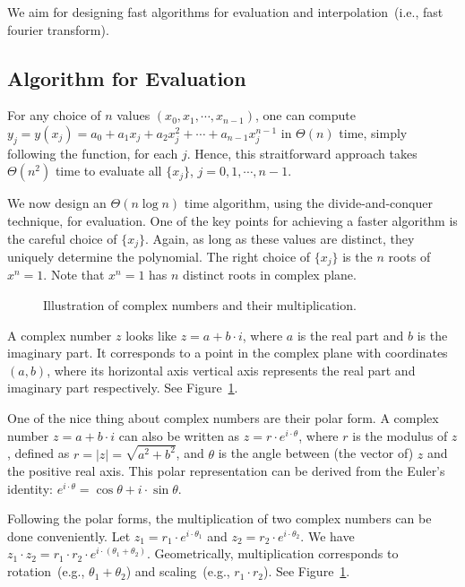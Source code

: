 We aim for designing fast algorithms for evaluation and interpolation~(i.e., fast fourier transform).


\subsection*{Algorithm for Evaluation}

For any choice of $n$ values $(x_0, x_1, \cdots, x_{n-1})$, 
one can compute $y_j = y(x_j) = a_0 + a_1x_j + a_2x_j^2 + \cdots + a_{n-1} x_j^{n-1}$ in $\Theta(n)$ time,
simply following the function, for each $j$. Hence, this straitforward approach takes $\Theta(n^2)$ time
to evaluate all $\{x_j\}$, $j = 0, 1, \cdots, n-1$.

We now design an $\Theta(n\log n)$ time algorithm, using the divide-and-conquer technique, for evaluation.
One of the key points for achieving a faster algorithm is the careful choice of $\{x_j\}$.
Again, as long as these values are distinct, they uniquely determine the polynomial. 
The right choice of $\{x_j\}$ is the $n$ roots of $x^n = 1$. Note that $x^n = 1$ has $n$ distinct roots
in complex plane. 

\begin{figure}[h!]
\centering{}
\caption{Illustration of complex numbers and their multiplication.}
\label{fig:complex}
\end{figure}

A complex number $z$ looks like $z = a + b\cdot i$, where $a$ is the real part and $b$ is the imaginary part.
It corresponds to a point in the complex plane with coordinates $(a, b)$, 
where its horizontal axis vertical axis represents the real part and imaginary part respectively.
See Figure~\ref{fig:complex}.

One of the nice thing about complex numbers are their polar form. 
A complex number $z = a+ b\cdot i$ can also be written as $z = r\cdot e^{i\cdot \theta}$,
where $r$ is the modulus of $z$, defined as $r = |z| = \sqrt{a^2 + b^2}$,
and $\theta$ is the angle between (the vector of) $z$ and the positive real axis.
This polar representation can be derived from the Euler’s identity: $e^{i\cdot \theta} = \cos \theta + i\cdot \sin \theta$.

Following the polar forms, the multiplication of two complex numbers can be done conveniently.
Let $z_1 = r_1\cdot e^{i\cdot \theta_1}$ and
$z_2 = r_2\cdot e^{i\cdot \theta_2}$. We have $z_1\cdot z_2 =r_1\cdot r_2 \cdot e^{i\cdot (\theta_1 + \theta_2)}$.
Geometrically, multiplication corresponds to rotation~(e.g., $\theta_1 + \theta_2$) and scaling~(e.g., $r_1\cdot r_2$).
See Figure~\ref{fig:complex}.


